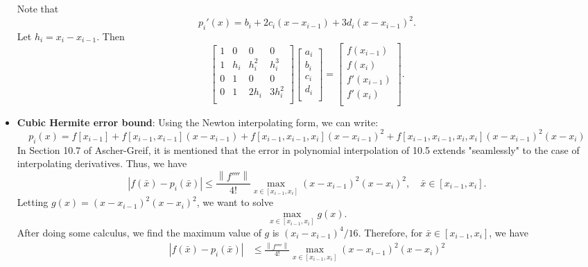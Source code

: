 \documentclass{report}
\begin{document}
\begin{itemize}
            \bigbreak \noindent 
            Note that
            $$p_i'(x) = b_i + 2c_i(x-x_{i-1}) + 3d_i(x-x_{i-1})^2.$$
            Let $h_i = x_i - x_{i-1}$. Then
            $$
            \begin{bmatrix}
                1&0&0&0\\
                1&h_i&h_i^2&h_i^3\\
                0&1&0&0\\
                0&1&2h_i&3h_i^2\\
            \end{bmatrix}
            \begin{bmatrix}
                a_i\\b_i\\c_i\\d_i\\
            \end{bmatrix}
            =
            \begin{bmatrix}
                f(x_{i-1})\\f(x_{i})\\f'(x_{i-1})\\f'(x_{i})\\
            \end{bmatrix}.
            $$
        \item \textbf{Cubic Hermite error bound}:
            Using the Newton interpolating form, we can write:
            $$p_i(x) = f[x_{i-1}] + f[x_{i-1},x_{i-1}](x-x_{i-1}) + f[x_{i-1},x_{i-1},x_i](x-x_{i-1})^2 + f[x_{i-1},x_{i-1},x_i,x_i](x-x_{i-1})^2(x-x_i)$$
            In Section 10.7 of Ascher-Greif, it is mentioned that the error in polynomial interpolation of 10.5 extends "seamlessly" to the case of interpolating derivatives. Thus, we have
            $$\left|f(\bar x) - p_i(\bar x)\right| \leq \frac{\left\|f''''\right\|}{4!} \max_{x \in [x_{i-1},x_i]} (x-x_{i-1})^2(x-x_i)^2, \quad \bar x \in [x_{i-1},x_i].$$
            \bigbreak \noindent 
            Letting $g(x) = (x-x_{i-1})^2(x-x_i)^2$, we want to solve
            $$\max_{x \in [x_{i-1},x_i]} g(x).$$
            \bigbreak \noindent 
            After doing some calculus, we find the maximum value of $g$ is $(x_{i}-x_{i-1})^4/16$.
            \bigbreak \noindent 
            Therefore, for $\bar x \in [x_{i-1},x_i]$, we have
            $$
            \begin{align}
                \left|f(\bar x) - p_i(\bar x)\right| 
&\leq \frac{\left\|f''''\right\|}{4!} \max_{x \in [x_{i-1},x_i]} (x-x_{i-1})^2(x-x_i)^2\\

\end{align}$$
\end{itemize}
\end{document}
